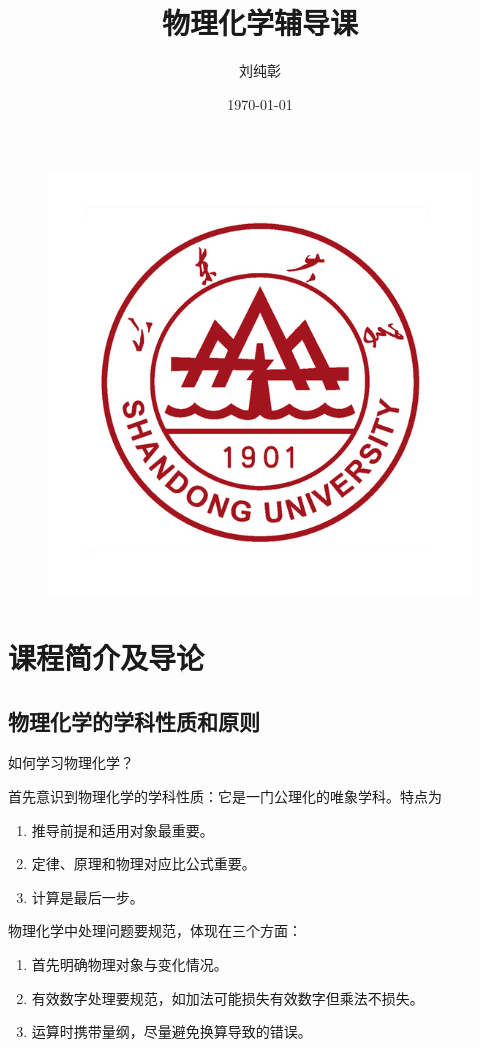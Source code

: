 \documentclass[9pt]{beamer}
\author{刘纯彰}
\title{物理化学辅导课}
\institute{Qingdao Institute for Theoretical and Computational Sciences\\ Shandong University}
\date{\today}
\begin{document}
	\begin{frame}
    	\titlepage
    	\begin{figure}[htb]
           	 \includegraphics[width=0.15\linewidth]{./pictures/SDUlogo.jpg}
		\end{figure}
	\end{frame}

	\begin{frame}
    	\tableofcontents[sectionstyle=show,subsectionstyle=show/shaded/hide]
	\end{frame}

	\section{课程简介及导论}
	
	\subsection{物理化学的学科性质和原则}

	\begin{frame}
	
	如何学习物理化学？
	
	\hspace*{\fill}	
	
	首先意识到物理化学的学科性质：它是一门{\color{red}公理化}的{\color{red}唯象学科}。特点为
	
	\begin{enumerate}
	
	\item {\color{red}推导前提}和{\color{red}适用对象}最重要。
	
	\item 定律、原理和物理对应比公式重要。
	
	\item 计算是最后一步。
	
	\end{enumerate}
	
	\hspace*{\fill}
	
	物理化学中处理问题要规范，体现在三个方面：
	\begin{enumerate}
	

	\item 首先明确{\color{red}物理对象}与{\color{red}变化情况}。
	
	\item {\color{red}有效数字}处理要规范，如加法可能损失有效数字但乘法不损失。	
	
	\item {\color{red}运算时携带量纲}，尽量避免换算导致的错误。	
	
	\end{enumerate}
	
	\end{frame}
\end{document}
